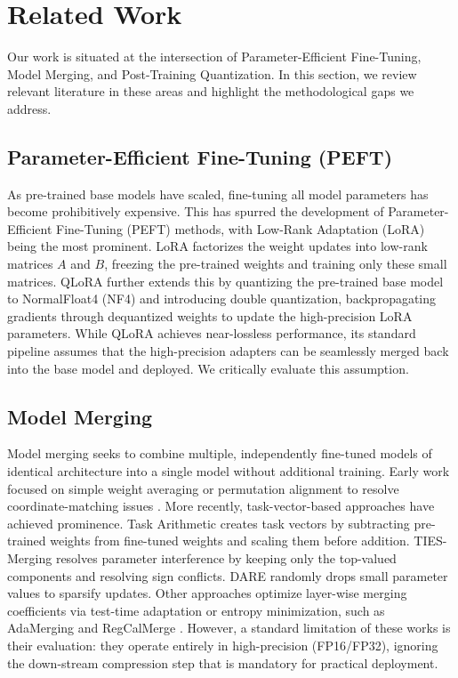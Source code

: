 \section{Related Work}
\label{sec:related_work}

Our work is situated at the intersection of Parameter-Efficient Fine-Tuning, Model Merging, and Post-Training Quantization. In this section, we review relevant literature in these areas and highlight the methodological gaps we address.

\subsection{Parameter-Efficient Fine-Tuning (PEFT)}
As pre-trained base models have scaled, fine-tuning all model parameters has become prohibitively expensive. This has spurred the development of Parameter-Efficient Fine-Tuning (PEFT) methods, with Low-Rank Adaptation (LoRA) \cite{Hu2021LoRA} being the most prominent. LoRA factorizes the weight updates into low-rank matrices $A$ and $B$, freezing the pre-trained weights and training only these small matrices. QLoRA \cite{Dettmers2023QLoRA} further extends this by quantizing the pre-trained base model to NormalFloat4 (NF4) and introducing double quantization, backpropagating gradients through dequantized weights to update the high-precision LoRA parameters. While QLoRA achieves near-lossless performance, its standard pipeline assumes that the high-precision adapters can be seamlessly merged back into the base model and deployed. We critically evaluate this assumption.

\subsection{Model Merging}
Model merging seeks to combine multiple, independently fine-tuned models of identical architecture into a single model without additional training. Early work focused on simple weight averaging \cite{Wortsman2022ModelSoups} or permutation alignment to resolve coordinate-matching issues \cite{Ainsworth2022GitReBasin,Stoica2023ZipIt}. More recently, task-vector-based approaches have achieved prominence. Task Arithmetic \cite{Ilharco2022TaskArithmetic} creates task vectors by subtracting pre-trained weights from fine-tuned weights and scaling them before addition. TIES-Merging \cite{Yadav2023TIES} resolves parameter interference by keeping only the top-valued components and resolving sign conflicts. DARE \cite{Yu2023DARE} randomly drops small parameter values to sparsify updates. Other approaches optimize layer-wise merging coefficients via test-time adaptation \cite{Wang2021Tent} or entropy minimization, such as AdaMerging \cite{MergingSub3} and RegCalMerge \cite{MergingSub3}. However, a standard limitation of these works is their evaluation: they operate entirely in high-precision (FP16/FP32), ignoring the down-stream compression step that is mandatory for practical deployment.

